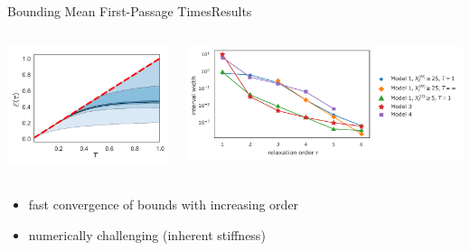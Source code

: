 \documentclass[10pt]{beamer}
\newcommand{\bottomcite}[1]{\vspace*{\fill} {\scriptsize \parencite{#1}}}
\begin{document}
\begin{frame}{Bounding Mean First-Passage Times}{Results}
    \begin{columns}
        \begin{column}{.33\paperwidth}
            \includegraphics[width=\textwidth]{../gfx/mfpt_bounds.pdf}
        \end{column}
        \begin{column}{.57\paperwidth}
            \includegraphics[width=\textwidth]{../gfx/convergence.pdf}
        \end{column}
    \end{columns}
    \vspace{2em}
    \begin{itemize}
        \item fast convergence of bounds with increasing order
        \item numerically challenging (inherent stiffness)
    \end{itemize}
\bottomcite{backenkohler2019bounding}
\end{frame}
\end{document}
